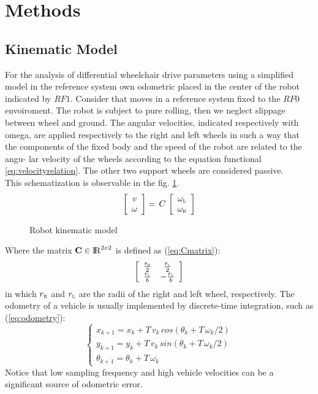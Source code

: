 \section{Methods}
\subsection{Kinematic Model}
For the analysis of differential wheelchair drive parameters using a simplified model in the reference system own odometric placed in the center of the robot indicated by $RF1$. Consider that moves in a reference system fixed to the $RF0$ envoiroment. The robot is subject to pure rolling, then we neglect slippage between wheel and ground. The angular velocities, indicated respectively with omega, are applied respectively to the right and left wheels in such a way that the components of the fixed body and the speed of the robot are related to the angu- lar velocity of the wheels according to the equation functional \ref{eq:velocityrelation}. The other two support wheels are considered passive. \\This schematization is observable in the fig. \ref{fig:model}.
\begin{equation}
\label{eq:velocityrelation}
	\left[ \begin{array}{cc}
				v	\\									
				\omega 							
			 \end{array} 
	\right]  =\, C\,
	\left[ \begin{array}{cc}
 				\omega_\textsc{l} \\ 
				\omega_\textsc{r}
			 \end{array} 
	\right]
\end{equation}

\begin{figure}[!h]
\centering
    \resizebox{.8\linewidth}{!}{}
\caption{Robot kinematic model}
\label{fig:model}
\end{figure}
\noindent Where the matrix $\textbf{C} \in \operatorname{\rm I\!R}^{2 x 2}$ is defined as (\ref{eq:Cmatrix}):
\begin{equation}
\label{eq:Cmatrix}
	\left[ \begin{array}{cc}
 				\frac{r_\textsc{r}}{2} &	\frac{r_\textsc{l}}{2} \\
				\frac{r_\textsc{l}}{b} &	-\frac{r_\textsc{l}}{b} 
			 \end{array} 
	\right]
\end{equation}
in which $r_\textsc{r}$ and $r_\textsc{l}$ are the radii of the right and left wheel, respectively.
The odometry of a vehicle is usually implemented by discrete-time integration, such as (\ref{eq:odometry}):
\begin{equation}
\label{eq:odometry}
	\begin{cases}
		x_{k+1} = x_{k} + T \, v_{k} \, cos(\theta_{k} + T \,\omega_{k}/2)\\
		y_{k+1} = y_{k} + T \, v_{k} \, sin(\theta_{k} + T \, \omega_{k}/2)\\
		\theta_{k+1} = \theta_{k} + T \, \omega_{k}
	\end{cases}
\end{equation}           
Notice that low sampling frequency and high vehicle velocities can be a significant source of odometric error.

